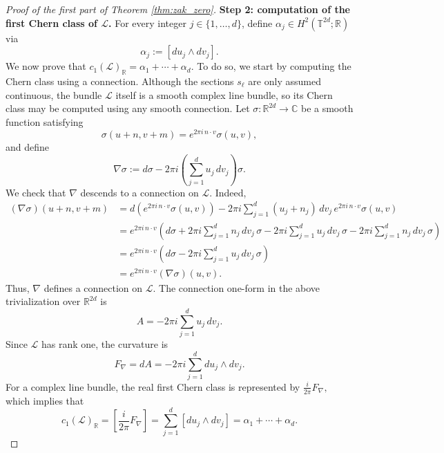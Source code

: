 \documentclass[10pt,a4paper]{amsart}
\begin{document}
\begin{proof}[Proof of the first part of Theorem \ref{thm:zak_zero}]
\smallskip
\noindent\textbf{Step 2: computation of the first Chern class of $\mathcal L$.}
For every integer $j \in \{ 1,\dots,d \}$, define $\alpha_j \in H^2(\mathbb T^{2d};\mathbb R)$ via
$$
\alpha_j:=[du_j\wedge dv_j].
$$
We now prove that
$
c_1(\mathcal L)_{\mathbb R}
=
\alpha_1+\cdots+\alpha_d.
$
To do so, we start by computing the Chern class using a connection. Although the sections
$s_\ell$ are only assumed continuous, the bundle $\mathcal L$ itself is a smooth
complex line bundle, so its Chern class may be computed using any smooth connection.
Let $\sigma:\mathbb R^{2d}\to\mathbb C$ be a smooth function satisfying
$$
\sigma(u+n,v+m)=e^{2\pi i\,n\cdot v}\sigma(u,v),
$$
and define
$$
\nabla\sigma
:=
d\sigma
-
2\pi i
\left(\sum_{j=1}^d u_j\,dv_j\right)\sigma.
$$
We check that $\nabla$ descends to a connection on $\mathcal L$. Indeed,
$$
\begin{aligned}
(\nabla\sigma)(u+n,v+m)
&=
d\!\left(e^{2\pi i\,n\cdot v}\sigma(u,v)\right)
-
2\pi i\sum_{j=1}^d (u_j+n_j)\,dv_j\,
e^{2\pi i\,n\cdot v}\sigma(u,v) \\
&=
e^{2\pi i\,n\cdot v}
\left(
d\sigma
+
2\pi i\sum_{j=1}^d n_j\,dv_j\,\sigma
-
2\pi i\sum_{j=1}^d u_j\,dv_j\,\sigma
-
2\pi i\sum_{j=1}^d n_j\,dv_j\,\sigma
\right) \\
&=
e^{2\pi i\,n\cdot v}
\left(
d\sigma
-
2\pi i\sum_{j=1}^d u_j\,dv_j\,\sigma
\right) \\
&=
e^{2\pi i\,n\cdot v}(\nabla\sigma)(u,v).
\end{aligned}
$$
Thus, $\nabla$ defines a
connection on $\mathcal L$.
The connection one-form in the above trivialization over $\mathbb R^{2d}$ is
$$
A
=
-2\pi i\sum_{j=1}^d u_j\,dv_j.
$$
Since $\mathcal L$ has rank one, the curvature is
$$
F_\nabla=dA
=
-2\pi i\sum_{j=1}^d du_j\wedge dv_j.
$$
For a complex line bundle, the real first Chern class is represented by
$
\frac{i}{2\pi}F_\nabla,
$
which implies that
$$
c_1(\mathcal L)_{\mathbb R}
=
\left[\frac{i}{2\pi}F_\nabla\right]
=
\sum_{j=1}^d [du_j\wedge dv_j]
=
\alpha_1+\cdots+\alpha_d.
$$


\end{proof}
\end{document}
